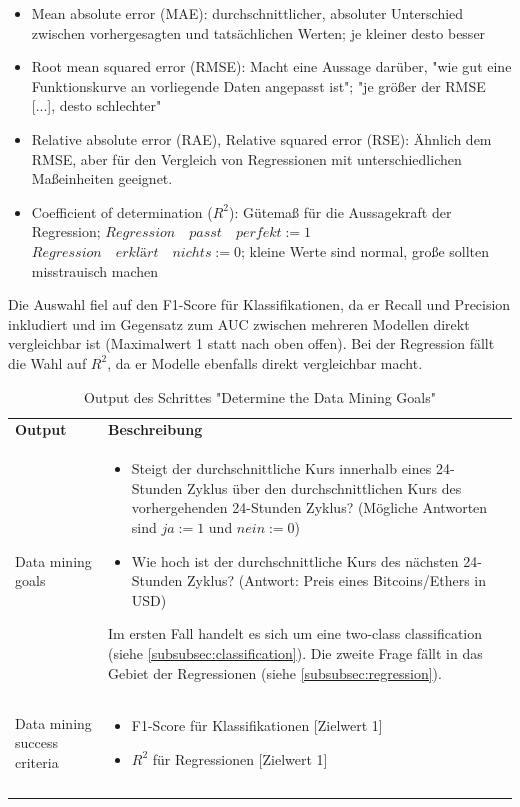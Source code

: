 \begin{itemize}
\item Mean absolute error (MAE): durchschnittlicher, absoluter Unterschied zwischen vorhergesagten und tatsächlichen Werten; je kleiner desto besser\citep{mircosoft_evaluate_2017}
\item Root mean squared error (RMSE): Macht eine Aussage darüber, "wie gut eine Funktionskurve an vorliegende Daten angepasst ist"; "je größer der RMSE [...], desto schlechter"\citep{statista_root_nodate}
\item Relative absolute error (RAE), Relative squared error (RSE): Ähnlich dem RMSE, aber für den Vergleich von Regressionen mit unterschiedlichen Maßeinheiten geeignet.\citep{dr._sayad_model_2017}
\item Coefficient of determination ($ R^2 $): Gütemaß für die Aussagekraft der Regression; 
\newline
$Regression \quad passt \quad perfekt := 1$ 
\newline 
$Regression \quad erklärt \quad nichts := 0$;
\newline 
kleine Werte sind normal, große sollten misstrauisch machen\citep{mircosoft_evaluate_2017}
\end{itemize}
Die Auswahl fiel auf den F1-Score für Klassifikationen, da er Recall und Precision inkludiert und im Gegensatz zum AUC zwischen mehreren Modellen direkt vergleichbar ist (Maximalwert 1 statt nach oben offen). Bei der Regression fällt die Wahl auf $ R^2 $, da er Modelle ebenfalls direkt vergleichbar macht.

\begin{centering} \footnotesize \begin{longtable}[!h]{|p{}|p{12cm}|}
\hline
\textbf{Output} & \textbf{Beschreibung} \\ 
\hhline{==}
Data mining goals & \begin{itemize}
\item Steigt der durchschnittliche Kurs innerhalb eines 24-Stunden Zyklus über den durchschnittlichen Kurs des vorhergehenden 24-Stunden Zyklus? (Mögliche Antworten sind $ja := 1$ und $nein := 0$) 
\item Wie hoch ist der durchschnittliche Kurs des nächsten 24-Stunden Zyklus? (Antwort: Preis eines Bitcoins/Ethers in USD)
\end{itemize} 
Im ersten Fall handelt es sich um eine two-class classification (siehe \ref{subsubsec:classification}). Die zweite Frage fällt in das Gebiet der Regressionen (siehe \ref{subsubsec:regression}). \\
\hline
Data mining success criteria &\begin{itemize}
\item F1-Score für Klassifikationen [Zielwert 1]
\item $ R^2 $ für Regressionen [Zielwert 1]
\end{itemize} \\
\\
\hline
\caption{Output des Schrittes "Determine the Data Mining Goals"} \label{tab:goalsSuccess}
\end{longtable} \end{centering}

